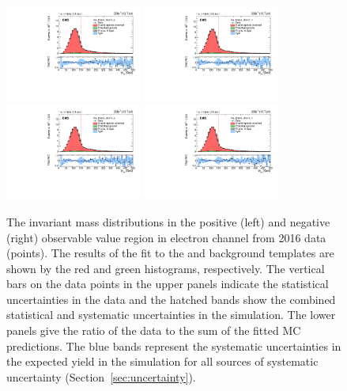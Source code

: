 \begin{figure}
    \includegraphics[width=0.4\textwidth]{figure/FitResult_16_el_lep_tmass_obs12_p_chi2_20.pdf}
    \includegraphics[width=0.4\textwidth]{figure/FitResult_16_el_lep_tmass_obs12_n_chi2_20.pdf}
    \includegraphics[width=0.4\textwidth]{figure/FitResult_16_el_lep_tmass_obs14_p_chi2_20.pdf}
    \includegraphics[width=0.4\textwidth]{figure/FitResult_16_el_lep_tmass_obs14_n_chi2_20.pdf}
    \caption[The \Mlb invariant mass distributions in electron channel from 2016 data.]
    {
        The \Mlb invariant mass distributions in the positive (left) and negative (right) observable value region in electron channel from 2016 data (points).
        The results of the fit to the \ttbar and background templates are shown by the red and green histograms, respectively.
        The vertical bars on the data points in the upper panels indicate the statistical uncertainties in the data and the hatched bands show the combined statistical and systematic uncertainties in the simulation.
        The lower panels give the ratio of the data to the sum of the fitted MC predictions.
        The blue bands represent the systematic uncertainties in the expected yield in the simulation for all sources of systematic uncertainty (Section~\ref{sec:uncertainty}).
    }
    \label{fig:fitting_results_16_el}
\end{figure}

